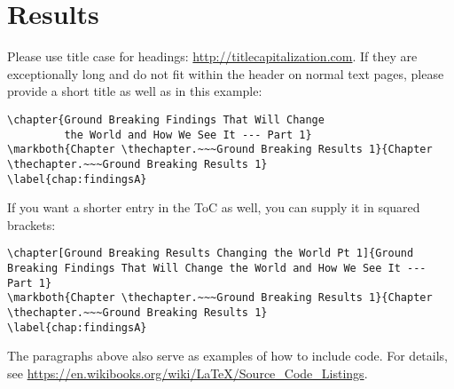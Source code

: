 \chapter{Results}
\label{chap:results}
Please use title case for headings: \url{http://titlecapitalization.com}. If they are exceptionally long and do not fit within the header on normal text pages, please provide a short title as well as in this example:
\begin{lstlisting}
\chapter{Ground Breaking Findings That Will Change
         the World and How We See It --- Part 1}
\markboth{Chapter \thechapter.~~~Ground Breaking Results 1}{Chapter \thechapter.~~~Ground Breaking Results 1}
\label{chap:findingsA}
\end{lstlisting}
If you want a shorter entry in the ToC as well, you can supply it in squared brackets:
\begin{lstlisting}
\chapter[Ground Breaking Results Changing the World Pt 1]{Ground Breaking Findings That Will Change the World and How We See It --- Part 1}
\markboth{Chapter \thechapter.~~~Ground Breaking Results 1}{Chapter \thechapter.~~~Ground Breaking Results 1}
\label{chap:findingsA}
\end{lstlisting}
The paragraphs above also serve as examples of how to include code. For details, see \eg \url{https://en.wikibooks.org/wiki/LaTeX/Source_Code_Listings}.


